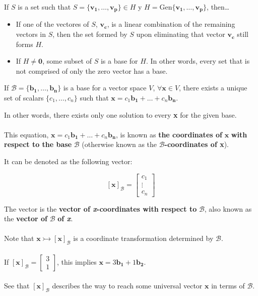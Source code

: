 \documentclass[12pt]{article}
\newcommand{\gen}[1]{\mathrm{Gen}\{{#1}\}}
\newcommand{\bt}[1]{\textbf{{#1}}}
\newcommand{\bm}[1]{\mathbf{{#1}}}
\newcommand{\mb}{\begin{bmatrix}}
\newcommand{\me}{\end{bmatrix}}
\newcommand{\mmc}[1]{\mathcal{{#1}}}
\begin{document}
If $S$ is a set such that $S = \{\bm{v_1,\dots,v_p}\} \in H$ y $H = \gen{\bm{v_1,\dots,v_p}}$, then\dots

\begin{itemize}
    \item If one of the vectores of $S$, $\bm{v_c}$, is a linear combination of the remaining vectors in $S$, then the set formed by $S$
    upon eliminating that vector $\bm{v_c}$ still forms $H$.
    \item If $H \neq {\bm{0}}$, some subset of $S$ is a base for $H$. In other words, every set that is not comprised of only the zero vector has a base.
\end{itemize}

If $\mathcal{B} = \{\bm{b_1},\dots,\bm{b_n}\}$ is a base for a vector space $V$, $\forall \bm{x} \in V$, there exists a unique set of scalars
$\{c_1,\dots,c_n\}$ such that $\bm{x} = c_1\bm{b_1} + \dots + c_n\bm{b_n}$.

In other words, there exists only one solution to every \bt{x} for the given base. \\ \\

This equation,  $\bm{x} = c_1\bm{b_1} + \dots + c_n\bm{b_n}$, is known as \bt{the coordinates of} $\bm{x}$ \bt{with respect to the base} $\bm{\mmc{B}}$
(otherwise known as the $\bm{\mmc{B}}$\bt{-coordinates of x}).

It can be denoted as the following vector:

$$[\bm{x}]_{\mmc{B}} = \mb c_1 \\ \vdots \\ c_n \me$$

The vector is the \bt{vector of \emph{x}-coordinates with respect to} $\bm{\mmc{B}}$, also known as the \bt{vector of} $\bm{\mmc{B}}$ \bt{of \emph{x}}. \\ \\

Note that $\bm{x} \rightarrowtail [\bm{x}]_\mmc{B}$ is a coordinate transformation determined by $\bm{\mmc{B}}$. \\ \\

If $[\bm{x}]_\mmc{B} = \mb 3 \\ 1 \me$, this implies $\bm{x} = 3\bm{b_1} + 1\bm{b_2}$. \\ \\

See that $[\bm{x}]_\mmc{B}$ describes the way to reach some universal vector $\bm{x}$ in terms of $\mmc{B}$. \\ \\
\end{document}
